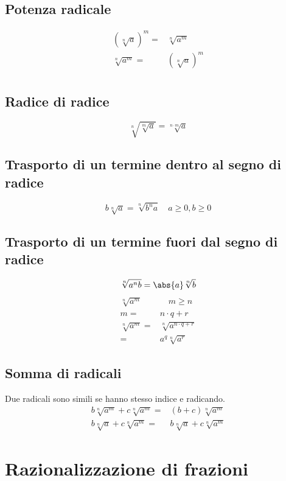 \section{Potenza radicale}
\begin{align}
\left(\sqrt[n]{a}\right)^m=&\sqrt[n]{a^m}\\
\sqrt[n]{a^m}=&\left(\sqrt[n]{a}\right)^m\\
\end{align}
\section{Radice di radice}
\begin{equation}
\sqrt[n]{\sqrt[m]{a}}=\sqrt[n\cdot m]{a}
\end{equation}
\section{Trasporto di un termine dentro al segno di radice}
\begin{equation}
b\sqrt[n]{a}=\sqrt[n]{b^na}\quad a\geq 0,b\geq 0 
\end{equation}
\section{Trasporto di un termine fuori dal segno di radice}
\begin{equation}
\sqrt[n]{a^nb}=\abs{a}\sqrt[n]{b}
\end{equation}
\begin{align}
\sqrt[n]{a^m}&\quad m\geq n\\
m=&n\cdot q+r\\
\sqrt[n]{a^m}=&\sqrt[n]{a^{n\cdot q+r}}\\
=&a^q\sqrt[n]{a^r}
\end{align}
\section{Somma di radicali}
Due radicali sono simili se hanno stesso indice e radicando.
\begin{align}
b\sqrt[n]{a^m}+c\sqrt[n]{a^m}=&(b+c)\sqrt[n]{a^m}\\
b\sqrt[n]{a}+c\sqrt[n]{a^m}=&b\sqrt[n]{a}+c\sqrt[n]{a^m}
\end{align}
\chapter{Razionalizzazione di frazioni}

